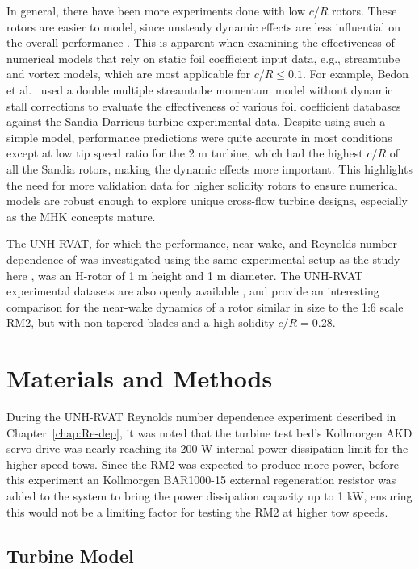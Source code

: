 In general, there have been more experiments done with low $c/R$ rotors. These
rotors are easier to model, since unsteady dynamic effects are less influential
on the overall performance \cite{Strickland1981}. This is apparent when
examining the effectiveness of numerical models that rely on static foil
coefficient input data, e.g., streamtube and vortex models, which are most
applicable for $c/R \leq 0.1$. For example, Bedon et al.~\cite{Bedon2014}
used a double multiple streamtube momentum model without dynamic stall
corrections to evaluate the effectiveness of various foil coefficient databases
against the Sandia Darrieus turbine experimental data. Despite using such a
simple model, performance predictions were quite accurate in most conditions
except at low tip speed ratio for the 2 m turbine, which had the highest $c/R$
of all the Sandia rotors, making the dynamic effects more important. This
highlights the need for more validation data for higher solidity rotors to
ensure numerical models are robust enough to explore unique cross-flow turbine
designs, especially as the MHK concepts mature.

The UNH-RVAT, for which the performance, near-wake, and Reynolds number
dependence of was investigated using the same experimental setup as the study
here \cite{Bachant2015-JoT, Bachant2016-Energies}, was an H-rotor of 1 m height
and 1 m diameter. The UNH-RVAT experimental datasets are also openly available
\cite{Bachant2014-RVAT-baseline, Bachant2016-RVAT-Re-dep}, and provide an
interesting comparison for the near-wake dynamics of a rotor similar in size to
the 1:6 scale RM2, but with non-tapered blades and a high solidity $c/R = 0.28$.


\section{Materials and Methods}

During the UNH-RVAT Reynolds number dependence experiment described in
Chapter~\ref{chap:Re-dep}, it was noted that the turbine test bed's Kollmorgen
AKD servo drive was nearly reaching its 200 W internal power dissipation limit
for the higher speed tows. Since the RM2 was expected to produce more power,
before this experiment an Kollmorgen BAR1000-15 external regeneration resistor
was added to the system to bring the power dissipation capacity up to 1 kW,
ensuring this would not be a limiting factor for testing the RM2 at higher tow
speeds.

\subsection{Turbine Model}

